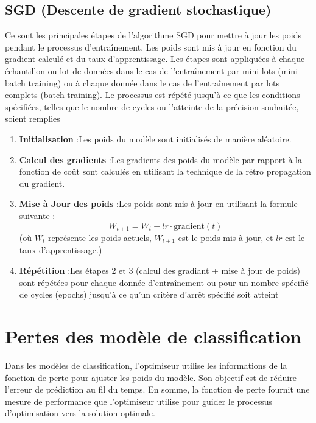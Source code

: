 \subsection{SGD (Descente de gradient stochastique) }
Ce sont les principales étapes de l'algorithme SGD pour mettre à jour les poids pendant le processus d'entraînement. Les poids sont mis à jour en fonction du gradient calculé et du taux d'apprentissage. Les étapes sont appliquées à chaque échantillon ou lot de données dans le cas de l'entraînement par mini-lots (mini-batch training) ou à chaque donnée dans le cas de l'entraînement par lots complets (batch training). Le processus est répété jusqu'à ce que les conditions spécifiées, telles que le nombre de cycles ou l'atteinte de la précision souhaitée, soient remplies
\begin{enumerate}
    \item \textbf{Initialisation }:Les poids du modèle sont initialisés de manière aléatoire.
    \item \textbf{Calcul des gradients }:Les gradients des poids du modèle par rapport à la fonction de coût sont calculés en utilisant la technique de la rétro propagation du gradient.
    \item \textbf{Mise à Jour des poids }:Les poids sont mis à jour en utilisant la formule suivante :
    \[W_{t+1} = W_t - lr \cdot \text{gradient}(t)\]
    (où \( W_t \) représente les poids actuels, \( W_{t+1} \) est le poids mis à jour, et \( lr \) est le taux d'apprentissage.)
    \item \textbf{Répétition }:Les étapes 2 et 3 (calcul des gradiant + mise à jour de poids) sont répétées pour chaque donnée d'entraînement ou pour un nombre spécifié de cycles (epochs) jusqu'à ce qu'un critère d'arrêt spécifié soit atteint
\end{enumerate}

\section{Pertes des modèle de classification }
Dans les modèles de classification, l'optimiseur utilise les informations de la fonction de perte pour ajuster les poids du modèle. Son objectif est de réduire l'erreur de prédiction au fil du temps. En somme, la fonction de perte fournit une mesure de performance que l'optimiseur utilise pour guider le processus d'optimisation vers la solution optimale.

